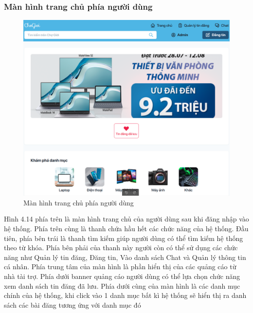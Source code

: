 \documentclass[../DoAn.tex]{subfiles}
\begin{document}
\subsubsection{Màn hình trang chủ phía người dùng}
\begin{figure}[H]
    \centering
    \includegraphics[width=0.9\linewidth]{Hinhve/1-home.png}
    \caption{Màn hình trang chủ phía người dùng}
    \label{fig:Fig1}
\end{figure}
Hình 4.14 phía trên là màn hình trang chủ của người dùng sau khi đăng nhập vào hệ thống. Phía trên cùng là thanh chứa hầu hết các chức năng của hệ thống. Đầu tiên, phía bên trái là thanh tìm kiếm giúp người dùng có thể tìm kiếm hệ thống theo từ khóa. Phía bên phải của thanh này người còn có thể sử dụng các chức năng như Quản lý tin đăng, Đăng tin, Vào danh sách Chat và Quản lý thông tin cá nhân. Phía trung tâm của màn hình là phần hiển thị của các quảng cáo từ nhà tài trợ. Phía dưới banner quảng cáo người dùng có thể lựa chọn chức năng xem danh sách tin đăng đã lưu. Phía dưới cùng của màn hình là các danh mục chính của hệ thống, khi click vào 1 danh mục bất kì hệ thống sẽ hiển thị ra danh sách các bài đăng tương ứng với danh mục đó
\newpage
\end{document}
